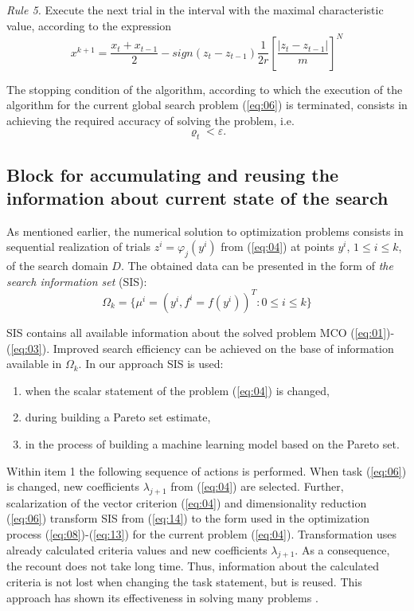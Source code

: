 \documentclass[runningheads]{llncs}
\begin{document}
\textit{Rule 5.} Execute the next trial in the interval with the maximal characteristic value, according to the expression
\begin{equation}
    \label{eq:12}
    x^{k+1} = \frac{x_t + x_{t-1}}{2} - sign(z_t - z_{t-1}) \frac{1}{2r} \left[\frac{|z_t - z_{t-1}|}{m} \right]^N
\end{equation}

The stopping condition of the algorithm, according to which the execution of the algorithm for the current global search problem (\ref{eq:06}) is terminated, consists in achieving the required accuracy of solving the problem, i.e.
\begin{equation}
    \label{eq:13}
    \varrho_t < \varepsilon.
\end{equation}



\subsection{Block for accumulating and reusing the information about current state of the search}
\label{subsec32}

As mentioned earlier, the numerical solution to optimization problems consists in sequential realization of trials $z^i=\varphi_j (y^i)$ from (\ref{eq:04}) at points $y^i$, $1 \leq i \leq k$, of the search domain $D$. The obtained data can be presented in the form of \textit{the search information set} (SIS):
\begin{equation}
    \label{eq:14}
    \Omega_k=\{\mu^i=(y^i,f^i=f(y^i))^T: 0 \leq i \leq k\}
\end{equation}

SIS contains all available information about the solved problem MCO (\ref{eq:01})-(\ref{eq:03}). Improved search efficiency can be achieved on the base of information available in $\Omega_k$. In our approach SIS is used:
\begin{enumerate}
	\item	when the scalar statement of the problem (\ref{eq:04}) is changed,
	\item	during building a Pareto set estimate, 
	\item	in the process of building a machine learning model based on the Pareto set.
\end{enumerate}

Within item 1 the following sequence of actions is performed. When task (\ref{eq:06}) is changed, new coefficients $\lambda_{j+1}$ from (\ref{eq:04}) are selected. Further, scalarization of the vector criterion (\ref{eq:04}) and dimensionality reduction (\ref{eq:06}) transform SIS from (\ref{eq:14}) to the form used in the optimization process (\ref{eq:08})-(\ref{eq:13}) for the current problem (\ref{eq:04}). Transformation uses already calculated criteria values and new coefficients $\lambda_{j+1}$. As a consequence, the recount does not take long time. Thus, information about the calculated criteria is not lost when changing the task statement, but is reused. This approach has shown its effectiveness in solving many problems \cite{Konnov2025,Gergel2018,GergelKozinov2020}.
\end{document}
